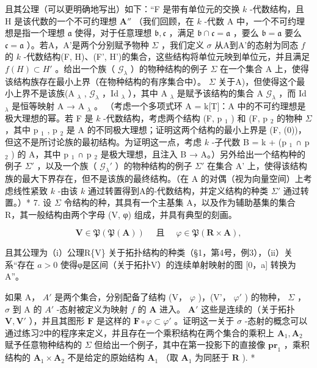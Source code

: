 且其公理（可以更明确地写出）如下：“F 是带有单位元的交换 \(k\) -代数结构，且 H 是该代数的一个不可约理想 \(\mathbf{A}''\) （我们回顾，在 \(k\) -代数 A 中，一个不可约理想是指一个理想 \(\mathfrak{a}\) 使得，对于任意理想 \(\mathfrak{b}, \mathfrak{c}\) ，满足 \(\mathfrak{b} \cap \mathfrak{c} = \mathfrak{a}\) ，要么 \(\mathfrak{b} = \mathfrak{a}\) 要么 \(\mathfrak{c} = \mathfrak{a}\) ）。若A，A'是两个分别赋予物种 \(\Sigma\) ，我们定义 \(\sigma\) 从A到A'的态射为同态 \(f\) 的 \(k\) -代数结构(F, H)、(F', H')的集合，这些结构将单位元映到单位元，并且满足 \(f(H) \subset H'\) 。给出一个族（ \(\mathcal{G}_{\lambda}\) ）的物种结构的例子 \(\Sigma\) 在一个集合 A 上，使得该结构族存在最小上界（在物种结构的有序集合中）。 \(\Sigma\) 关于A)，但使得这个最小上界不是该族(A \(_{\lambda}\) , \(\mathcal{G}_{\lambda}\) ，Id \(_{\lambda}\) ），其中 A \(_{\lambda}\) 是赋予该结构的集合 A \(\mathcal{G}_{\lambda}\) ，而 Id \(_{\lambda}\) 是恒等映射 A → A \(_{\lambda}\) 。 （考虑一个多项式环 A = k{[}T{]}：A 中的不可约理想是极大理想的幂。若 F 是 \(k\) -代数结构，考虑两个结构 (F, p \(_1\) ) 和 (F, p \(_2\) 的物种 \(\Sigma\) ，其中 p \(_1\) , p \(_2\) 是 A 的不同极大理想；证明这两个结构的最小上界是 (F, (0))，但这不是所讨论族的最初结构。为证明这一点，考虑 \(k\) -子代数 B = k + (p \(_1\) ∩ p \(_2\) ) 的 A，其中 p \(_1\) ∩ p \(_2\) 是极大理想，且注入 B → A。）另外给出一个结构种的例子 \(\Sigma'\) ，以及一个族（ \(\mathcal{G}_{\lambda}'\) ）的物种结构的例子 \(\Sigma'\) 在集合 A' 上，使得该结构族的最大下界存在，但不是该族的最终结构。（在 A 的对偶（视为向量空间）上考虑线性紧致 \(k\) -由该 \(k\) 通过转置得到A的-代数结构，并定义结构的种类 \(\Sigma'\) 通过转置。）* 7. 设 \(\Sigma\) 令结构的种，其具有一个主基集 A，以及作为辅助基集的集合 R，其一般结构由两个字母 (V, φ) 组成，并具有典型的刻画。

\[
\mathbf {V} \in \mathfrak {P} (\mathfrak {P} (\mathbf {A})) \quad \text { 且 } \quad \varphi \in \mathfrak {P} (\mathbf {R} \times \mathbf {A}),
\]

且其公理为（i）公理R\{V\} 关于拓扑结构的种类（§1，第4号，例3），（ii）关系“存在 \(a>0\) 使得φ是区间（关于拓扑V）的连续单射映射的图 {[}0，a{]} 转换为A''。

如果 A， \(A'\) 是两个集合，分别配备了结构 (V， \(\varphi\) )，(V'， \(\varphi'\) ) 的物种， \(\Sigma\) ， \(\sigma\) 到 A 的 \(A'\) -态射被定义为映射 \(f\) 的 \(\mathbf{A}\) 进入。 \(\mathbf{A}'\) 这些是连续的（关于拓扑 \(\mathbf{V}, \mathbf{V}'\) ），并且其图形 \(\mathbf{F}\) 是这样的 \(\mathbf{F} \circ \varphi \subset \varphi'\) 。证明这一关于 \(\sigma\) -态射的概念可以通过练习2中的程序来定义，并且存在一个乘积结构在两个集合的乘积上 \(\mathbf{A}_1, \mathbf{A}_2\) 赋予任意物种结构的 \(\Sigma\) 但给出一个例子，其中在第一投影下的直接像 \(\mathbf{pr}_1\) ，乘积结构的 \(\mathbf{A}_1 \times \mathbf{A}_2\) 不是给定的原始结构 \(\mathbf{A}_1\) （取 \(\mathbf{A}_1\) 为同胚于 \(\mathbf{R}\) ). *

